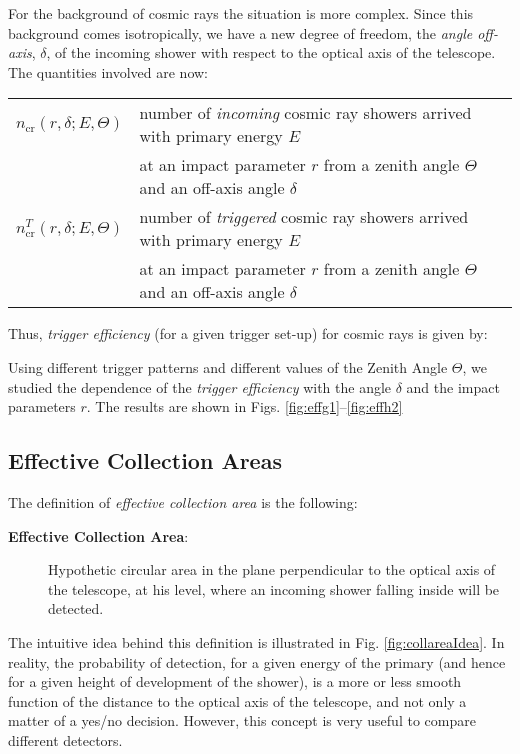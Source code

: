 For the background of cosmic rays the situation is more complex. Since
this background comes isotropically, we have a new degree of freedom,
the \emph{angle off-axis}, $\delta$, of the incoming shower with
respect to the optical axis of the telescope. The quantities involved
are now:
%
\begin{center}
  \begin{tabular}{cl}
    $n_{\mathrm{cr}}(r,\delta;E,\Theta)$ & number of \emph{incoming} 
    cosmic ray showers arrived with primary energy $E$ \\
    & at an impact parameter $r$ from a zenith angle $\Theta$
    and an off-axis angle $\delta$\\
    $n_{\mathrm{cr}}^T(r,\delta;E,\Theta)$ & number of \emph{triggered} 
    cosmic ray showers arrived with primary energy $E$ \\
    & at an impact parameter $r$ from a zenith angle $\Theta$
    and an off-axis angle $\delta$\\
  \end{tabular}
\end{center}
%
Thus, \emph{trigger efficiency} (for a given trigger set-up) for
cosmic rays is given by:
%
\effcreq

Using different trigger patterns and different values of the Zenith
Angle $\Theta$, we studied the dependence of the \emph{trigger
  efficiency} with the angle $\delta$ and the impact parameters $r$.
The results are shown in Figs. \ref{fig:effg1}--\ref{fig:effh2}

\subsection{Effective Collection Areas}

The definition of \emph{effective collection area} is the following:
%
\begin{description}
\item[{\bfseries Effective Collection Area}:] Hypothetic circular area
  in the plane perpendicular to the optical axis of the telescope, at
  his level, where an incoming shower falling inside will be detected.
\end{description}
%
The intuitive idea behind this definition is illustrated in Fig.
\ref{fig:collareaIdea}. In reality, the probability of detection, for
a given energy of the primary (and hence for a given height of
development of the shower), is a more or less smooth function of the
distance to the optical axis of the telescope, and not only a matter
of a yes/no decision. However, this concept is very useful to compare
different detectors.

